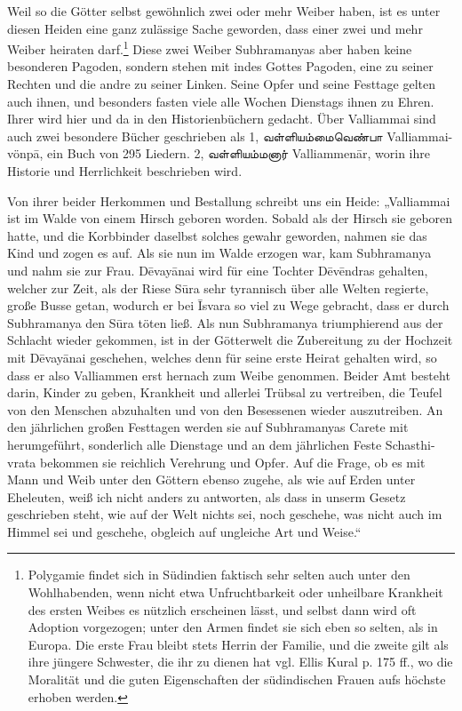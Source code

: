 \documentclass{article}
\newcommand{\TamilText}[1]{\texttamil{#1}}
\newcommand{\tam}[1]{\TamilText{#1}}
\begin{document}
Weil so die Götter selbst gewöhnlich zwei oder mehr Weiber haben, ist es unter diesen Heiden eine ganz zulässige Sache geworden, dass einer zwei und mehr Weiber heiraten darf.\footnote{Polygamie findet sich in Südindien faktisch sehr selten auch unter den Wohlhabenden, wenn nicht etwa Unfruchtbarkeit oder unheilbare Krankheit des ersten Weibes es nützlich erscheinen lässt, und selbst dann wird oft Adoption vorgezogen; unter den Armen findet sie sich eben so selten, als in Europa. Die erste Frau bleibt stets Herrin der Familie, und die zweite gilt als ihre jüngere Schwester, die ihr zu dienen hat vgl. Ellis Kural p. 175 ff., wo die Moralität und die guten Eigenschaften der südindischen Frauen aufs höchste erhoben werden.} Diese zwei Weiber Subhramanyas aber haben keine besonderen Pagoden, sondern stehen mit indes Gottes Pagoden, eine zu seiner Rechten und die andre zu seiner Linken. Seine Opfer und seine Festtage gelten auch ihnen, und besonders fasten viele alle Wochen Dienstags ihnen zu Ehren. Ihrer wird hier und da in den Historienbüchern gedacht. Über Valliammai sind auch zwei besondere Bücher geschrieben als 1, \tam{வள்ளியம்மைவெண்பா} Valliammai-vönp\={a}, ein Buch von 295 Liedern. 2, \tam{வள்ளியம்மனார்} Valliammen\={a}r, worin ihre Historie und Herrlichkeit beschrieben wird.

Von ihrer beider Herkommen und Bestallung schreibt uns ein Heide: „Valliammai ist im Walde von einem Hirsch geboren worden. Sobald als der Hirsch sie geboren hatte, und die Korbbinder daselbst solches gewahr geworden, nahmen sie das Kind und zogen es auf. Als sie nun im Walde erzogen war, kam Subhramanya und nahm sie zur Frau. D\={e}vay\={a}nai wird für eine Tochter D\={e}v\={e}ndras gehalten, welcher zur Zeit, als der Riese S\={u}ra sehr tyrannisch über alle Welten regierte, große Busse getan, wodurch er bei \={I}svara so viel zu Wege gebracht, dass er durch Subhramanya den S\={u}ra töten ließ. Als nun Subhramanya triumphierend aus der Schlacht wieder gekommen, ist in der Götterwelt die Zubereitung zu der Hochzeit mit D\={e}vay\={a}nai geschehen, welches denn für seine erste Heirat gehalten wird, so dass er also Valliammen erst hernach zum Weibe genommen. Beider Amt besteht darin, Kinder zu geben, Krankheit und allerlei Trübsal zu vertreiben, die Teufel von den Menschen abzuhalten und von den Besessenen wieder auszutreiben. An den jährlichen großen Festtagen werden sie auf Subhramanyas Carete mit herumgeführt, sonderlich alle Dienstage und an dem jährlichen Feste Schasthi-vrata bekommen sie reichlich Verehrung und Opfer. Auf die Frage, ob es mit Mann und Weib unter den Göttern ebenso zugehe, als wie auf Erden unter Eheleuten, weiß ich nicht anders zu antworten, als dass in unserm Gesetz geschrieben steht, wie auf der Welt nichts sei, noch geschehe, was nicht auch im Himmel sei und geschehe, obgleich auf ungleiche Art und Weise.“
\end{document}
